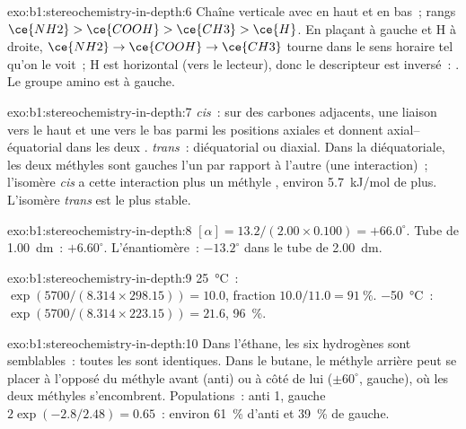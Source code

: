\begin{solution}{exo:b1:stereochemistry-in-depth:6}
Chaîne verticale avec  en haut et  en bas~; rangs
$\ce{NH2} > \ce{COOH} > \ce{CH3} > \ce{H}$. En plaçant  à gauche
et H à droite, $\ce{NH2} \to \ce{COOH} \to \ce{CH3}$ tourne dans le sens
horaire tel qu'on le voit~; H est horizontal (vers le lecteur), donc le
descripteur est inversé~: . Le groupe amino est à gauche.
\end{solution}

\begin{solution}{exo:b1:stereochemistry-in-depth:7}
\textit{cis}~: sur des carbones adjacents, une liaison vers le haut et
une vers le bas parmi les positions axiales et  donnent
axial--équatorial dans les deux .
\textit{trans}~: diéquatorial ou diaxial. Dans la  diéquatoriale,
les deux méthyles sont gauches l'un par rapport à l'autre (une
interaction)~; l'isomère \textit{cis} a cette interaction plus un méthyle
, environ \qty{5.7}{kJ/mol} de plus. L'isomère \textit{trans} est
le plus stable.
\end{solution}

\begin{solution}{exo:b1:stereochemistry-in-depth:8}
$[\alpha] = 13.2/(2.00 \times 0.100) = +66.0^\circ$. Tube de
\qty{1.00}{dm}~: $+6.60^\circ$. L'énantiomère~: $-13.2^\circ$ dans le
tube de \qty{2.00}{dm}.
\end{solution}

\begin{solution}{exo:b1:stereochemistry-in-depth:9}
\qty{25}{\celsius}~: $\exp(5700/(8.314 \times 298.15)) = 10.0$, fraction
$10.0/11.0 = \qty{91}{\percent}$. \qty{-50}{\celsius}~: $\exp(5700/(8.314
\times 223.15)) = 21.6$, \qty{96}{\percent}.
\end{solution}

\begin{solution}{exo:b1:stereochemistry-in-depth:10}
Dans l'éthane, les six hydrogènes sont semblables~: toutes les
 sont identiques. Dans le butane, le méthyle
arrière peut se placer à l'opposé du méthyle avant (anti) ou à côté de
lui ($\pm 60^\circ$, gauche), où les deux méthyles s'encombrent.
Populations~: anti 1, gauche $2\exp(-2.8/2.48) = 0.65$~: environ
\qty{61}{\percent} d'anti et \qty{39}{\percent} de gauche.
\end{solution}

